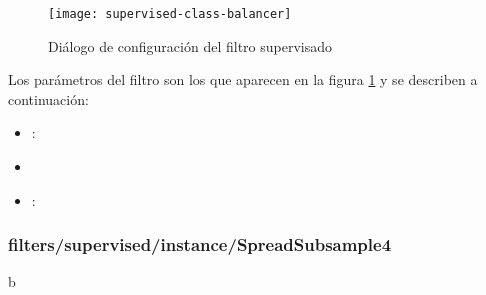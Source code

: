 \begin{figure}[ht]
    \centering
    \texttt{[image: supervised-class-balancer]}
    \caption{Diálogo de configuración del filtro supervisado }
    \label{fig:supervised-class-balancer}
\end{figure}

Los parámetros del filtro son los que aparecen en la figura \ref{fig:supervised-class-balancer} y se describen a continuación:
\begin{itemize}
    \item {}:
    \item {}
    \item {}: 
\end{itemize}
\clearpage
\subsubsection{filters/supervised/instance/SpreadSubsample4}
b
